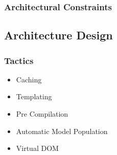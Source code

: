 \documentclass[a4paper,10pt]{article}
\begin{document}
    \subsubsection{Architectural Constraints}
  \subsection{Architecture Design}
    \subsubsection{Tactics}
      \begin{itemize}
        \item Caching
        \item Templating
        \item Pre Compilation
        \item Automatic Model Population
        \item Virtual DOM
      \end{itemize}
\end{document}
